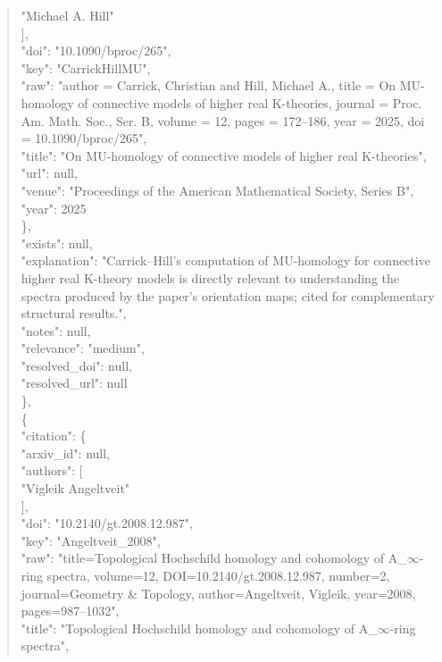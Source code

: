 \documentclass[11pt]{article}
\begin{document}
\begin{quote}
          "Michael A. Hill"\\
        ],\\
        "doi": "10.1090/bproc/265",\\
        "key": "CarrickHillMU",\\
        "raw": "author = Carrick, Christian and Hill, Michael A., title = On MU-homology of connective models of higher real K-theories, journal = Proc. Am. Math. Soc., Ser. B, volume = 12, pages = 172--186, year = 2025, doi = 10.1090/bproc/265",\\
        "title": "On MU-homology of connective models of higher real K-theories",\\
        "url": null,\\
        "venue": "Proceedings of the American Mathematical Society, Series B",\\
        "year": 2025\\
      \},\\
      "exists": null,\\
      "explanation": "Carrick--Hill's computation of MU-homology for connective higher real K-theory models is directly relevant to understanding the spectra produced by the paper's orientation maps; cited for complementary structural results.",\\
      "notes": null,\\
      "relevance": "medium",\\
      "resolved\_doi": null,\\
      "resolved\_url": null\\
    \},\\
    \{\\
      "citation": \{\\
        "arxiv\_id": null,\\
        "authors": [\\
          "Vigleik Angeltveit"\\
        ],\\
        "doi": "10.2140/gt.2008.12.987",\\
        "key": "Angeltveit\_2008",\\
        "raw": "title=Topological Hochschild homology and cohomology of A\_\ensuremath{\infty}-ring spectra, volume=12, DOI=10.2140/gt.2008.12.987, number=2, journal=Geometry \& Topology, author=Angeltveit, Vigleik, year=2008, pages=987--1032",\\
        "title": "Topological Hochschild homology and cohomology of A\_\ensuremath{\infty}-ring spectra",\\

\end{quote}
\end{document}
